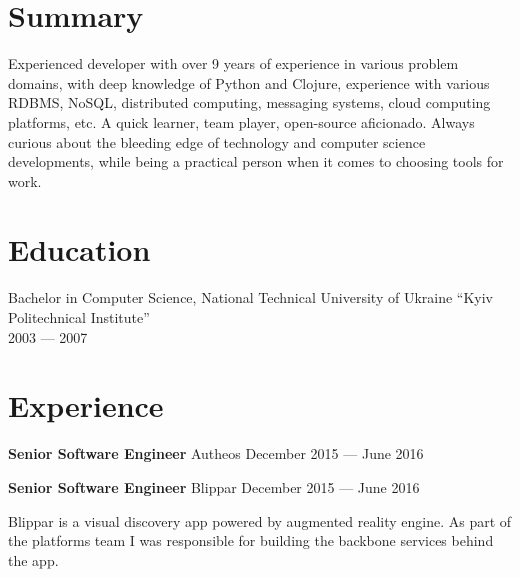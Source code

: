 \documentclass[margin]{res}
\begin{document}

\address{{\bf Mailing address} \\ Czaar Peterstraat 103B \\ 1018PE, Amsterdam \\ The Netherlands}

\address{{\bf Contacts} \\ +31 62 980 61 41 \\ contact@mishkovskyi.net \\ \href{https://github.com/mishok13}{mishok13@GitHub}}

\begin{resume}

\section{Summary}
Experienced developer with over 9 years of experience in various
problem domains, with deep knowledge of Python and Clojure, experience
with various RDBMS, NoSQL, distributed computing, messaging systems,
cloud computing platforms, etc. A quick learner, team player,
open-source aficionado. Always curious about the bleeding edge of
technology and computer science developments, while being a practical
person when it comes to choosing tools for work.

\section{Education}
Bachelor in Computer Science, National Technical University of Ukraine ``Kyiv Politechnical Institute'' \\
2003 --- 2007

\section{Experience}

{\bf Senior Software Engineer} Autheos \hfill December 2015 --- June 2016



{\bf Senior Software Engineer} Blippar \hfill December 2015 --- June 2016

Blippar is a visual discovery app powered by augmented reality
engine. As part of the platforms team I was responsible for building
the backbone services behind the app.


\end{resume}
\end{document}
